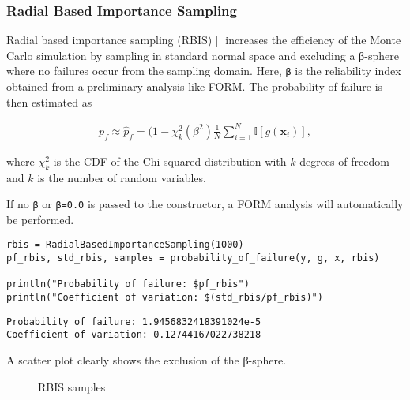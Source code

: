 \subsubsection{Radial Based Importance Sampling}



\label{2106574880283869235}{}


Radial based importance sampling (RBIS) [] increases the efficiency of the Monte Carlo simulation by sampling in standard normal space and excluding a β-sphere where no failures occur from the sampling domain. Here, \texttt{β} is the reliability index obtained from a preliminary analysis like FORM. The probability of failure is then estimated as



\begin{equation*}
\begin{split}p_f \approx \hat{p}_f = (1- \chi^2_k(\beta^2) \frac{1}{N} \sum_{i=1}^N \mathbb{I}[g(\boldsymbol{x}_i)],\end{split}\end{equation*}


where \(\chi^2_k\) is the CDF of the Chi-squared distribution with \(k\) degrees of freedom and \(k\) is the number of random variables.



If no \texttt{β} or \texttt{β=0.0} is passed to the  constructor, a FORM analysis will automatically be performed.




\begin{verbatim}
rbis = RadialBasedImportanceSampling(1000)
pf_rbis, std_rbis, samples = probability_of_failure(y, g, x, rbis)

println("Probability of failure: $pf_rbis")
println("Coefficient of variation: $(std_rbis/pf_rbis)")
\end{verbatim}


\begin{verbatim}
Probability of failure: 1.9456832418391024e-5
Coefficient of variation: 0.12744167022738218
\end{verbatim}



A scatter plot clearly shows the exclusion of the β-sphere. \begin{figure}
\centering
{}
\caption{RBIS samples}
\end{figure}




